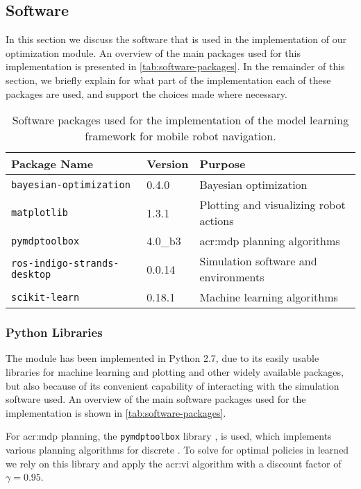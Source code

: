 \subsection{Software}
\label{sec:software}

In this section we discuss the software that is used in the implementation of our optimization module. 
An overview of the main packages used for this implementation is presented in \autoref{tab:software-packages}.
In the remainder of this section, we briefly explain for what part of the implementation each of these packages are used, and support the choices made where necessary.

\begin{table}[pt]
\caption{Software packages used for the implementation of the model learning framework for mobile robot navigation.}
\label{tab:software-packages}\centering
\begin{tabular}{|l|l|l|}
	\hline%
	\textbf{Package Name} & \textbf{Version} & \textbf{Purpose} \\
	\hline
	\texttt{bayesian-optimization} & 0.4.0 & Bayesian optimization \\
	\texttt{matplotlib} & 1.3.1 & Plotting and visualizing robot actions \\
	\texttt{pymdptoolbox} & 4.0\_b3 & \acrshort{acr:mdp} planning algorithms \\
	\texttt{ros-indigo-strands-desktop} & 0.0.14 & Simulation software and environments\\
	\texttt{scikit-learn} & 0.18.1 & Machine learning algorithms \\ \hline
\end{tabular}
\end{table}

\subsubsection{Python Libraries}

The module has been implemented in Python 2.7, due to its easily usable libraries for machine learning and plotting and other widely available packages, but also because of its convenient capability of interacting with the simulation software used.
An overview of the main software packages used for the implementation is shown in \autoref{tab:software-packages}.

\newpage

For \acrshort{acr:mdp} planning, the \texttt{pymdptoolbox} library \cite{cordwellpymdptoolbox}, is used, which implements various planning algorithms for discrete . 
To solve for optimal policies in learned  we rely on this library and apply the \acrshort{acr:vi} algorithm with a discount factor of $\gamma = 0.95$.

